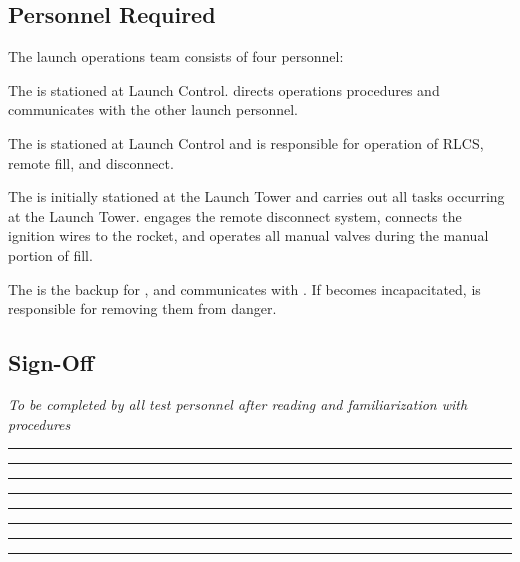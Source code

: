 \subsection{Personnel Required}
The launch operations team consists of four personnel:
\begin{checklist}
    \item The \opsfull{} is stationed at Launch Control. \ops{} directs operations procedures and communicates with the other launch personnel.
    \item The \controlfull{} is stationed at Launch Control and is responsible for operation of RLCS, remote fill, and disconnect.
    \item The \primaryfull{} is initially stationed at the Launch Tower and carries out all tasks occurring at the Launch Tower. \primary{} engages the remote disconnect system, connects the ignition wires to the rocket, and operates all manual valves during the manual portion of fill.
    \item The \secondaryfull{} is the backup for \primary{}, and communicates with \ops{}. If \primary{} becomes incapacitated, \secondary{} is responsible for removing them from danger.
\end{checklist}
\setcounter{checklistnum}{0}

\subsection{Sign-Off}
\textit{To be completed by all test personnel after reading and familiarization with procedures}
\begin{checklist}
    \item \opsfull      \tabto{25em}\rule{10em}{0.4pt}\hspace{5em}\rule{10em}{0.4pt}
    \item \controlfull      \tabto{25em}\rule{10em}{0.4pt}\hspace{5em}\rule{10em}{0.4pt}
    \item \primaryfull  \tabto{25em}\rule{10em}{0.4pt}\hspace{5em}\rule{10em}{0.4pt}
    \item \secondaryfull\tabto{25em}\rule{10em}{0.4pt}\hspace{5em}\rule{10em}{0.4pt}
\end{checklist}
\setcounter{checklistnum}{0}
\newpage{}

